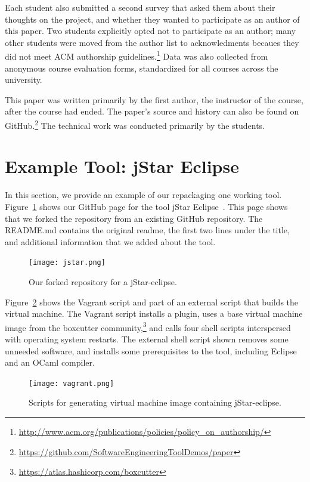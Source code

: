 \documentclass[10pt,conference]{IEEEtran}
\begin{document}
Each student also submitted a second survey that
asked them about their thoughts on the project,
and whether they wanted to participate as an
author of this paper.
Two students explicitly opted not to participate as an author;
many other students were moved from the author list to
acknowledments becaues they did not meet ACM authorship
guidelines.\footnote{\url{http://www.acm.org/publications/policies/policy_on_authorship/}}
Data was also collected from 
anonymous course evaluation forms, standardized for all courses 
across the university.

This paper was written primarily by the first author,
the instructor of the course, after the course 
had ended.
The paper's source and history can also be found 
on GitHub.\footnote{\url{https://github.com/SoftwareEngineeringToolDemos/paper}}
The technical work was conducted primarily by the students.

\section{Example Tool: jStar Eclipse}

In this section, we provide an example of our repackaging 
one working tool.
Figure~\ref{fig:jstar} shows our GitHub page for
the tool jStar Eclipse~\cite{jstar}.
This page shows that we forked
the repository from an existing GitHub repository.
The README.md contains the original readme,
the first two lines under the title,
and additional information that we added about the tool.


\begin{figure}[t]
  \centering
    \texttt{[image: jstar.png]}
  \caption{Our forked repository for a jStar-eclipse.}\label{fig:jstar}
\end{figure}

Figure~\ref{fig:vagrant} shows the Vagrant script and 
part of an external script that builds the virtual machine.
The Vagrant script installs a plugin, 
uses a base virtual machine image from the boxcutter 
community,\footnote{\url{https://atlas.hashicorp.com/boxcutter}}
and calls four shell scripts interspersed with operating system 
restarts.
The external shell script shown removes some unneeded software,
and installs some prerequisites to the tool, including Eclipse and
an OCaml compiler. 

\begin{figure}[t]
  \centering
    \texttt{[image: vagrant.png]}
  \caption{Scripts for generating virtual machine image containing jStar-eclipse.}\label{fig:vagrant}
\end{figure}
\end{document}
